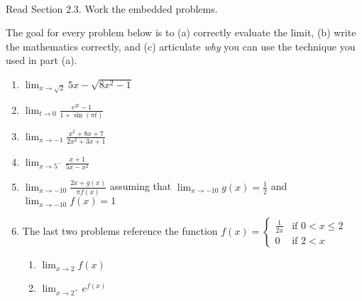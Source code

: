\documentclass[11pt,fleqn]{article}
\begin{document}
\renewcommand{\headrulewidth}{0pt}
\newcommand{\blank}[1]{\rule{#1}{0.75pt}}
\newcommand{\bc}{\begin{center}}
\newcommand{\ec}{\end{center}}
\renewcommand{\d}{\displaystyle}

\vspace*{-0.7in}

\begin{center}
  \large
  \\
\end{center}
Read Section 2.3. Work the embedded problems. \\
\hrulefill

The goal for every problem below is to (a) correctly evaluate the limit, (b) write the mathematics correctly, and (c) articulate \emph{why} you can use the technique you used in part (a).
\begin{enumerate}
\item $\displaystyle{\lim_{x \to \sqrt{2}} 5x -\sqrt{8x^2-1} }$
\vfill
\item $\displaystyle{\lim_{t \to 0} \frac{e^{2t}-1}{1 + \sin( \pi t)} }$
\vfill
\item $\displaystyle{\lim_{x \to -1} \frac{x^2+8x+7}{2x^2+3x+1}}$
\vfill
\newpage
\item $\displaystyle{\lim_{x \to 5^-} \frac{x+1}{5x-x^2} }$
\vfill
\item $\displaystyle{\lim_{x \to -10} \frac{2x + g(x)}{\pi f(x)}}$ assuming  that  $\displaystyle{\lim_{x \to -10} g(x) = \frac{1}{2}}$ and  $\displaystyle{\lim_{x \to -10} f(x) =1}$
\vfill
\item The last two problems reference the function $f(x) = \begin{cases} \frac{1}{2x} &\text{if } 0 < x \leq 2
\\ 0 &\text{if }  2<x \end{cases}$

\begin{enumerate}
\item $\displaystyle{\lim_{x \to 2} f(x)}$
\vfill
\item $\displaystyle{\lim_{x \to 2^+} e^{f(x)}}$
\end{enumerate}
\end{enumerate}
\end{document}

